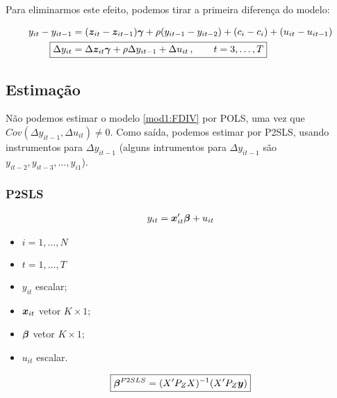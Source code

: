\documentclass[11pt,oneside,a4paper]{article}
\numberwithin{equation}{section}
\begin{document}
\begin{description}
\begin{description}
Para eliminarmos este efeito, podemos tirar a primeira diferença do modelo:

\vspace{-1 em}
\begin{align}
\nonumber
y_{it} - y_{it-1} &= 
(\mbs{z}_{it} - \mbs{z}_{it-1}) \mbs{\gamma} +
\rho (y_{i t - 1} -  y_{i t - 2} ) +
(c_{i} - c_{i}) + (u_{it} - u_{it-1})
\\
\label{mod1:FDIV}
\Aboxed{
\Delta y_{it} &= 
\Delta \mbs{z}_{it} \mbs{\gamma} + \rho \Delta y_{i t - 1} + \Delta u_{it}
\, , \qquad t=3, \dots, T}
\end{align}

\subsection*{Estimação}

Não podemos estimar o modelo \eqref{mod1:FDIV} por POLS, uma vez que $Cov(\Delta y_{it-1}, \Delta u_{it} ) \neq 0$.
Como saída, podemos estimar por P2SLS, usando instrumentos para $\Delta y_{it-1}$ (alguns intrumentos para $\Delta y_{it-1}$ são $y_{it-2}, y_{it-3}, \dots, y_{i1}$).

\subsubsection*{P2SLS}

\vspace{-1 em}
\begin{align*}
	y_{it} = \boldsymbol{x}_{it}' \boldsymbol{\beta} + u_{it}
\end{align*}

\begin{itemize}\itemsep0pt
\item $i = 1, \dots, N$
\item $t = 1, \dots, T$
\item $y_{it}$ escalar;
\item $\boldsymbol{x}_{it}$  vetor $K \times 1$;
\item $\boldsymbol{\beta}$ vetor $K \times 1$;
\item $u_{it}$ escalar.
\end{itemize}

\vspace{-1 em}
\begin{align*}
\boxed{
\boldsymbol{\beta}^{P2SLS} =  ( X' P_{Z} X )^{-1} ( X' P_{Z} \boldsymbol{y} ) }
\end{align*}


\end{description}
\end{description}
\end{document}
